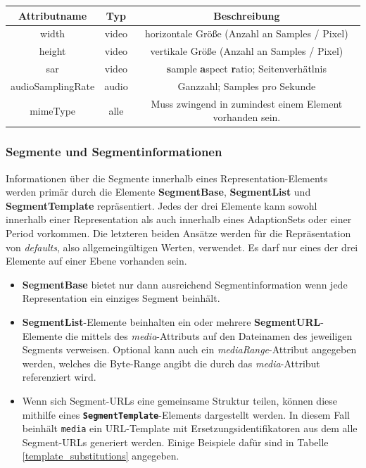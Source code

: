 \documentclass[paper = a4, fontsize = 12pt, parskip = half]{scrartcl} %
\def\attr#1{\texttt{#1}}
\def\elem#1{\texttt{\textbf{#1}}}
\begin{document}
\begin{center}
	\begin{tabular}{| c | c | c |}
		\hline
		\textbf{Attributname} & \textbf{Typ} & \textbf{Beschreibung}                                            \\
		\hline
		\hline
		width                 & video        & horizontale Größe (Anzahl an Samples / Pixel)                    \\
		\hline
		height                & video        & vertikale Größe (Anzahl an Samples / Pixel)                      \\
		\hline
		sar                   & video        & \textbf{s}ample \textbf{a}spect \textbf{r}atio; Seitenverhätlnis \\
		\hline
		audioSamplingRate     & audio        & Ganzzahl; Samples pro Sekunde                                    \\
		\hline
		mimeType              & alle         & Muss zwingend in zumindest einem Element vorhanden sein.         \\
		\hline
	\end{tabular}
\end{center}

\subsubsection{Segmente und Segmentinformationen}
Informationen über die Segmente innerhalb eines Representation-Elements werden primär durch die Elemente \textbf{SegmentBase}, \textbf{SegmentList} und \textbf{SegmentTemplate} repräsentiert. Jedes der drei Elemente kann sowohl innerhalb einer Representation als auch innerhalb eines AdaptionSets oder einer Period vorkommen. Die letzteren beiden Ansätze werden für die Repräsentation von \textit{defaults}, also allgemeingültigen Werten, verwendet. Es darf nur eines der drei Elemente auf einer Ebene vorhanden sein.

\begin{itemize}
	\item \textbf{SegmentBase} bietet nur dann ausreichend Segmentinformation wenn jede Representation ein einziges Segment beinhält.
	\item \textbf{SegmentList}-Elemente beinhalten ein oder mehrere \textbf{SegmentURL}-Elemente die mittels des \textit{media}-Attributs auf den Dateinamen des jeweiligen Segments verweisen. Optional kann auch ein \textit{mediaRange}-Attribut angegeben werden, welches die Byte-Range angibt die durch das \textit{media}-Attribut referenziert wird.
	\item Wenn sich Segment-URLs eine gemeinsame Struktur teilen, können diese mithilfe eines \elem{SegmentTemplate}-Elements dargestellt werden. In diesem Fall beinhält \attr{media} ein URL-Template mit Ersetzungsidentifikatoren aus dem alle Segment-URLs generiert werden. Einige Beispiele dafür sind in Tabelle \ref{template_substitutions} angegeben. 
\end{itemize}
\end{document}
